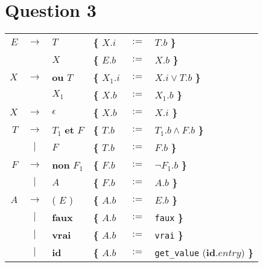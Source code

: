 \documentclass[class=article]{standalone}
\begin{document}
\section*{Question 3}

\begin{center}
  \begin{tabular}{rcllcl}

      $E$ & $\rightarrow$ & $T$          &{\bf\{} $X.i$   & $:=$ & $T.b$ {\bf\}}\\
          &               & $X$          &{\bf\{} $E.b$   & $:=$ & $X.b$ {\bf\}}\\
      $X$ & $\rightarrow$ & {\bf ou} $T$ &{\bf\{} $X_1.i$ & $:=$ & $X.i \vee T.b$ {\bf\}}\\
          &               & $X_1$        &{\bf\{} $X.b$   & $:=$ & $X_1.b$ {\bf\}}\\
      $X$ & $\rightarrow$ & $\epsilon$   &{\bf\{} $X.b$   & $:=$ & $X.i$ {\bf\}}\\

      $T$ & $\rightarrow$ & $T_1$ {\bf et} $F$ & {\bf\{} $T.b$ & $:=$ & $T_1.b \wedge F.b$ {\bf\}}\\
          & $|$           & $F$                & {\bf\{} $T.b$ & $:=$ & $F.b$ {\bf\}}\\

      $F$ & $\rightarrow$ & {\bf non} $F_1$    & {\bf\{} $F.b$ & $:=$ & $\neg F_1.b$ {\bf\}}\\
          & $|$           & $A$                & {\bf\{} $F.b$ & $:=$ & $A.b$ {\bf\}}\\

      $A$ & $\rightarrow$ & ( $E$ )            & {\bf\{} $A.b$ & $:=$ & $E.b$ {\bf\}}\\
          & $|$           & {\bf faux}         & {\bf\{} $A.b$ & $:=$ & \lstinline[]$faux$  {\bf\}}\\
          & $|$           & {\bf vrai}         & {\bf\{} $A.b$ & $:=$ & \lstinline[]$vrai$  {\bf\}}\\
          & $|$           & {\bf id}           & {\bf\{} $A.b$ & $:=$ & \lstinline[]$get_value$ ({\bf id}$.entry$) {\bf\}}\\
  \end{tabular}
\end{center}
\end{document}
